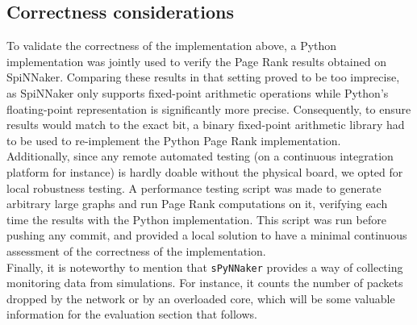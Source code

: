 \subsection{Correctness considerations} \label{sec:resval}


To validate the correctness of the implementation above, a Python implementation was jointly used to verify the Page Rank results obtained on SpiNNaker. Comparing these results in that setting proved to be too imprecise, as SpiNNaker only supports fixed-point arithmetic operations while Python's floating-point representation is significantly more precise. Consequently, to ensure results would match to the exact bit, a binary fixed-point arithmetic library had to be used to re-implement the Python Page Rank implementation. \\

Additionally, since any remote automated testing (on a continuous integration platform for instance) is hardly doable without the physical board, we opted for local robustness testing. A performance testing script was made to generate arbitrary large graphs and run Page Rank computations on it, verifying each time the results with the Python implementation. This script was run before pushing any commit, and provided a local solution to have a minimal continuous assessment of the correctness of the implementation. \\

Finally, it is noteworthy to mention that \texttt{sPyNNaker} provides a way of collecting monitoring data from simulations. For instance, it counts the number of packets dropped by the network or by an overloaded core, which will be some valuable information for the evaluation section that follows.

%
%
%
